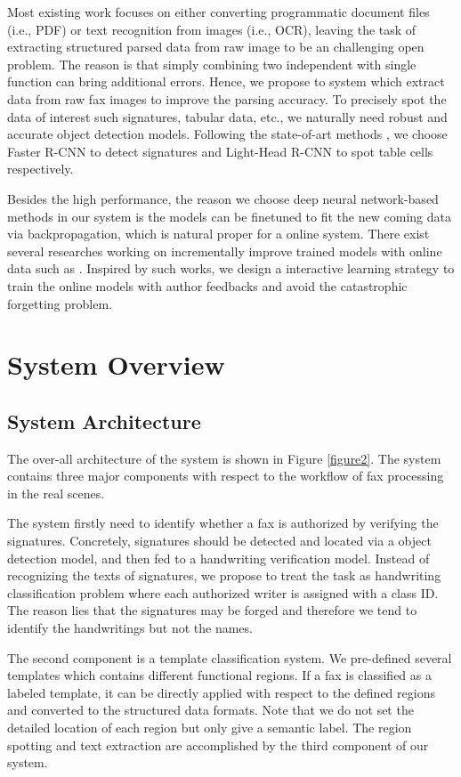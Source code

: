 \documentclass[sigconf]{acmart}
\begin{document}
Most existing work focuses on either converting programmatic document files (i.e., PDF) or text recognition from images (i.e., OCR), leaving the task of extracting structured parsed data from raw image to be an challenging open problem. The reason is that simply combining two independent with single function can bring additional errors. Hence, we propose to system which extract data from raw fax images to improve the parsing accuracy. To precisely spot the data of interest such signatures, tabular data, etc., we naturally need robust and accurate object detection models. Following the state-of-art methods \cite{ren2015faster, dai2016r, li2017light}, we choose Faster R-CNN \cite{ren2015faster} to detect signatures and Light-Head R-CNN \cite{li2017light} to spot table cells respectively.

Besides the high performance, the reason we choose deep neural network-based methods in our system is the models can be finetuned to fit the new coming data via backpropagation, which is natural proper for a online system. There exist several researches working on incrementally improve trained models with online data such as \cite{shmelkov2017incremental, su2016line}. Inspired by such works, we design a interactive learning strategy to train the online models with author feedbacks and avoid the catastrophic forgetting problem.

\section{System Overview}
\subsection{System Architecture}
The over-all architecture of the system is shown in Figure \ref{figure2}. The system contains three major components with respect to the workflow of fax processing in the real scenes.  

The system firstly need to identify whether a fax is authorized by verifying the signatures. Concretely, signatures should be detected and located via a object detection model, and then fed to a handwriting verification model. Instead of recognizing the texts of signatures, we propose to treat the task as handwriting classification problem where each authorized writer is assigned with a class ID. The reason lies that the signatures may be forged and therefore we tend to identify the handwritings but not the names. 

The second component is a template classification system. We pre-defined several templates which contains different functional regions. If a fax is classified as a labeled template, it can be directly applied with respect to the defined regions and converted to the structured data formats. Note that we do not set the detailed location of each region but only give a semantic label. The region spotting and text extraction are accomplished by the third component of our system.
\end{document}
